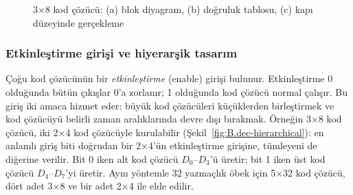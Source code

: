 \begin{figure}[H]
\caption{3×8 kod çözücü: (a) blok diyagram, (b) doğruluk tablosu, (c) kapı düzeyinde gerçekleme}
\label{fig:B.10}
\end{figure}

\subsubsection{Etkinleştirme girişi ve hiyerarşik tasarım}
Çoğu kod çözücünün bir \emph{etkinleştirme} (enable) girişi bulunur. Etkinleştirme 0 olduğunda bütün çıkışlar 0'a zorlanır; 1 olduğunda kod çözücü normal çalışır. Bu giriş iki amaca hizmet eder: büyük kod çözücüleri küçüklerden birleştirmek ve kod çözücüyü belirli zaman aralıklarında devre dışı bırakmak. Örneğin 3×8 kod çözücü, iki 2×4 kod çözücüyle kurulabilir (Şekil~\ref{fig:B.dec-hierarchical}): en anlamlı giriş biti doğrudan bir 2×4'ün etkinleştirme girişine, tümleyeni de diğerine verilir. Bit 0 iken alt kod çözücü $D_0$--$D_3$'ü üretir; bit 1 iken üst kod çözücü $D_4$--$D_7$'yi üretir. Aynı yöntemle 32 yazmaçlık öbek için 5×32 kod çözücü, dört adet 3×8 ve bir adet 2×4 ile elde edilir.

